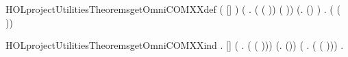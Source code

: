 \newcommand{\HOLprojectUtilitiesDate}{27 December 2018}
\newcommand{\HOLprojectUtilitiesTime}{12:52}
\begin{SaveVerbatim}{HOLprojectUtilitiesTheoremsgetOmniCOMXXdef}
\HOLTokenTurnstile{} ( [] \HOLSymConst{=} ) \HOLSymConst{\HOLTokenConj{}}
   (\HOLSymConst{\HOLTokenForall{}} .
       ( ( )\HOLSymConst{::}) \HOLSymConst{=}
       ( )) \HOLSymConst{\HOLTokenConj{}}
   (\HOLSymConst{\HOLTokenForall{}}.  (\HOLSymConst{::}) \HOLSymConst{=}  ) \HOLSymConst{\HOLTokenConj{}}
   \HOLSymConst{\HOLTokenForall{}} .
      ( ( )\HOLSymConst{::}) \HOLSymConst{=}  
\end{SaveVerbatim}
\newcommand{\HOLprojectUtilitiesTheoremsgetOmniCOMXXdef}{\UseVerbatim{HOLprojectUtilitiesTheoremsgetOmniCOMXXdef}}
\begin{SaveVerbatim}{HOLprojectUtilitiesTheoremsgetOmniCOMXXind}
\HOLTokenTurnstile{} \HOLSymConst{\HOLTokenForall{}}.
      [] \HOLSymConst{\HOLTokenConj{}} (\HOLSymConst{\HOLTokenForall{}} .  ( ( )\HOLSymConst{::})) \HOLSymConst{\HOLTokenConj{}}
     (\HOLSymConst{\HOLTokenForall{}}.   \HOLSymConst{\HOLTokenImp{}}  (\HOLSymConst{::})) \HOLSymConst{\HOLTokenConj{}}
     (\HOLSymConst{\HOLTokenForall{}} .   \HOLSymConst{\HOLTokenImp{}}  ( ( )\HOLSymConst{::})) \HOLSymConst{\HOLTokenImp{}}
     \HOLSymConst{\HOLTokenForall{}}.  
\end{SaveVerbatim}
\newcommand{\HOLprojectUtilitiesTheoremsgetOmniCOMXXind}{\UseVerbatim{HOLprojectUtilitiesTheoremsgetOmniCOMXXind}}
